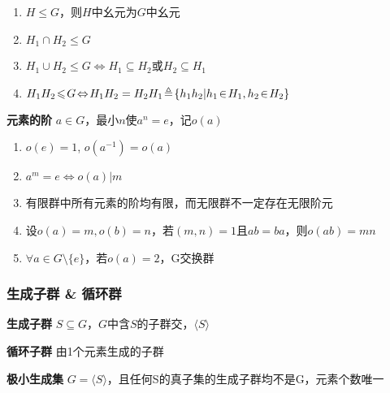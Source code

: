 \documentclass[b4paper, 10pt]{ctexart}
\renewcommand*{\iff}{\Leftrightarrow}
\renewcommand*{\leq}{\leqslant}
\newcommand*{\gengroup}[1]{\langle #1 \rangle}
\begin{document}
\begin{multicols}{3}
    \begin{theorem}[子群运算律($H_1, H_2 \!\leq\! G$)]
        \hfil

        \begin{enumerate}
            \item $H \!\leq\! G$，则$H$中幺元为$G$中幺元
            \item $H_1 \!\cap\! H_2 \!\leq\! G$
            \item $H_1 \!\cup\! H_2 \!\leq\! G \!\iff\! H_1 \!\subseteq\! H_2 $或$H_2 \!\subseteq\! H_1$
            \item $H_1 H_2 \!\leq\! G \!\iff\! H_1 H_2 = H_2 H_1 \\ \!\triangleq\! \{h_1h_2 | h_1 \!\in\! H_1, h_2 \!\in\! H_2\}$
        \end{enumerate}
    \end{theorem}

    \textbf{元素的阶} $a \!\in\! G$，最小$n$使$a^n \!=\! e$，记$o(a)$

    \begin{theorem}[阶的性质]
        \hfil

        \begin{enumerate}
            \item $o(e) = 1$, $o(a^{-1}) = o(a)$
            \item $a^m = e \iff o(a) | m$
            \item 有限群中所有元素的阶均有限，而无限群不一定存在无限阶元
            \item 设$o(a) = m, o(b) = n$，若$(m, n) = 1$且$ab = ba$，则$o(ab) = mn$
            \item $\forall a \!\in\! G \!\setminus\! \{e\}$，若$o(a) = 2$，G交换群
        \end{enumerate}
    \end{theorem}

    \subsubsection{生成子群 \& 循环群}

    \textbf{生成子群} $S \!\subseteq\! G$，$G$中含$S$的子群交，$\gengroup{S}$

    \textbf{循环子群} 由1个元素生成的子群

    \textbf{极小生成集} $G \! = \! \gengroup{S}$，且任何S的真子集的生成子群均不是G，元素个数唯一

    \begin{theorem}[循环群性质]
        \hfil


\end{theorem}
\end{multicols}
\end{document}

